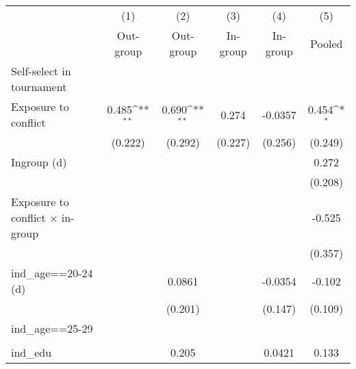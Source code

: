 {
\def\sym#1{\ifmmode^{#1}\else\(^{#1}\)\fi}
\begin{tabular}{l*{5}{c}}
\hline\hline
                    &\multicolumn{1}{c}{(1)}&\multicolumn{1}{c}{(2)}&\multicolumn{1}{c}{(3)}&\multicolumn{1}{c}{(4)}&\multicolumn{1}{c}{(5)}\\
                    &\multicolumn{1}{c}{Out-group}&\multicolumn{1}{c}{Out-group}&\multicolumn{1}{c}{In-group}&\multicolumn{1}{c}{In-group}&\multicolumn{1}{c}{Pooled}\\
\hline
Self-select in tournament&                     &                     &                     &                     &                     \\
Exposure to conflict&       0.485\sym{**} &       0.690\sym{**} &       0.274         &     -0.0357         &       0.454\sym{*}  \\
                    &     (0.222)         &     (0.292)         &     (0.227)         &     (0.256)         &     (0.249)         \\
[1em]
Ingroup (d)         &                     &                     &                     &                     &       0.272         \\
                    &                     &                     &                     &                     &     (0.208)         \\
[1em]
Exposure to conflict × in-group&                     &                     &                     &                     &      -0.525         \\
                    &                     &                     &                     &                     &     (0.357)         \\
[1em]
ind\_age==20-24 (d)  &                     &      0.0861         &                     &     -0.0354         &      -0.102         \\
                    &                     &     (0.201)         &                     &     (0.147)         &     (0.109)         \\
[1em]
ind\_age==25-29      &                     &                     &                     &                     &                     \\
                    &                     &                     &                     &                     &                     \\
[1em]
ind\_edu             &                     &       0.205         &                     &      0.0421         &       0.133         \\

\end{tabular}}
